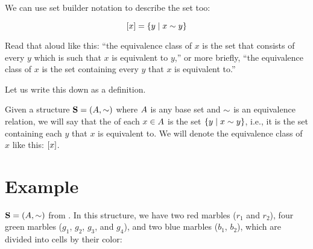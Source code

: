 \documentclass[../../../main.tex]{subfiles}
\begin{document}
We can use set builder notation to describe the set too:

\begin{equation*}
  \equivclass{x} = \{ y \mid x \equivalence/ y \}
\end{equation*}

Read that aloud like this: ``the equivalence class of $x$ is the set that consists of every $y$ which is such that $x$ is equivalent to $y$,'' or more briefly, ``the equivalence class of $x$ is the set containing every $y$ that $x$ is equivalent to.''

Let us write this down as a definition.

\begin{fdefinition}
  \label{def:equivalence-class}
  Given a structure $\struct{S} = (\set{A}, \equivalence/)$ where $A$ is any base set and $\equivalence/$ is an equivalence relation, we will say that the  of each $x \in A$ is the set $\{ y \mid x \equivalence/ y \}$, i.e., it is the set containing each $y$ that $x$ is equivalent to. We will denote the equivalence class of $x$ like this: $[x]$.
\end{fdefinition}


\section{Example}

 $\struct{S} = (\set{A}, \equivalence/)$ from . In this structure, we have two red marbles ($r_{1}$ and $r_{2}$), four green marbles ($g_{1}$, $g_{2}$, $g_{3}$, and $g_{4}$), and two blue marbles ($b_{1}$, $b_{2}$), which are divided into cells by their color:
\end{document}
